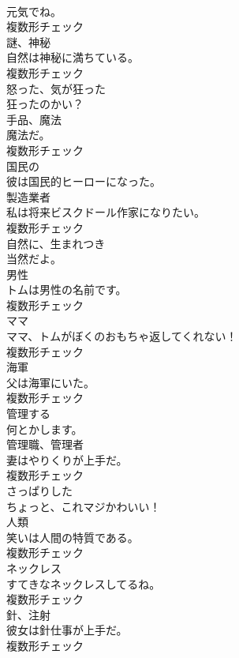 \documentclass[8pt]{extreport}
\begin{document}
\begin{CJK}{UTF8}{min}
\\	元気でね。	
\\	複数形チェック
\\	[名詞]	謎、神秘	
\\	自然は神秘に満ちている。	
\\	複数形チェック
\\	[形容詞]	怒った、気が狂った	
\\	狂ったのかい？	
\\	[名詞]	手品、魔法	
\\	魔法だ。	
\\	複数形チェック
\\	[形容詞]	国⺠の	
\\	彼は国民的ヒーローになった。	
\\	[名詞]	製造業者	
\\	私は将来ビスクドール作家になりたい。	
\\	複数形チェック
\\	[副詞]	自然に、生まれつき	
\\	当然だよ。	
\\	[名詞]	男性	
\\	トムは男性の名前です。	
\\	複数形チェック
\\	[名詞]	ママ	
\\	ママ、トムがぼくのおもちゃ返してくれない！	
\\	複数形チェック
\\	[名詞]	海軍	
\\	父は海軍にいた。	
\\	複数形チェック
\\	[動詞]	管理する	
\\	何とかします。	
\\	[名詞]	管理職、管理者	
\\	妻はやりくりが上手だ。	
\\	複数形チェック
\\	[形容詞]	さっぱりした	
\\	ちょっと、これマジかわいい！	
\\	[名詞]	人類	
\\	笑いは人間の特質である。	
\\	複数形チェック
\\	[名詞]	ネックレス	
\\	すてきなネックレスしてるね。	
\\	複数形チェック
\\	[名詞]	針、注射	
\\	彼女は針仕事が上手だ。	
\\	複数形チェック

\end{CJK}
\end{document}
